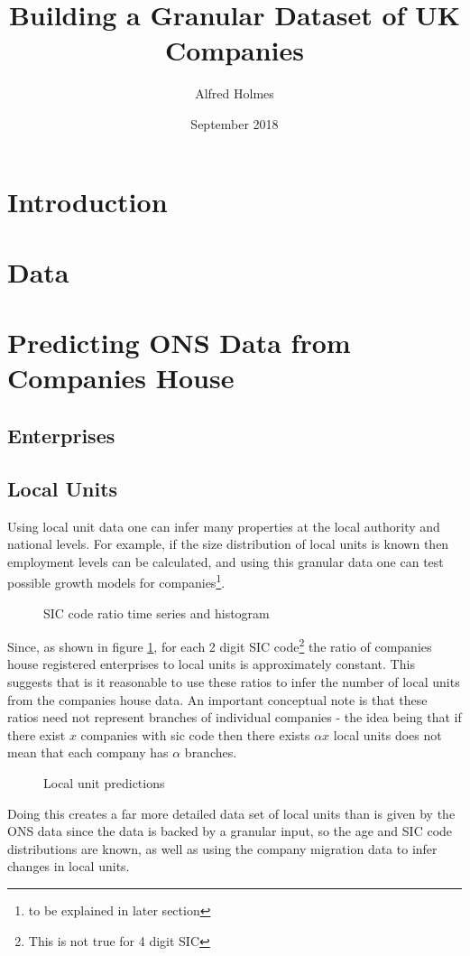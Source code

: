 \documentclass[a4paper,10pt]{article}
\title{Building a Granular Dataset of UK Companies}
\author{Alfred Holmes}
\date{September 2018}
\begin{document}
\maketitle
\section{Introduction}
\section{Data}
\section{Predicting ONS Data from Companies House}
\subsection{Enterprises}
\subsection{Local Units}
Using local unit data one can infer many properties at the local authority and national levels. For example, if the size distribution of local units is known then employment levels can be calculated, and using this granular data one can test possible growth models for companies\footnote{to be explained in later section}.
\begin{figure}[!ht]
 \caption{SIC code ratio time series and histogram}
 \label{sic_ratio}
\end{figure}

Since, as shown in figure \ref{sic_ratio}, for each 2 digit SIC code\footnote{This is not true for 4 digit SIC} the ratio of companies house registered enterprises to local units is approximately constant. This suggests that is it reasonable to use these ratios to infer the number of local units from the companies house data. An important conceptual note is that these ratios need not represent branches of individual companies - the idea being that if there exist $x$ companies with sic code then there exists $\alpha x$ local units does not mean that each company has $\alpha$ branches.

\begin{figure}[!ht]
 \caption{Local unit predictions}
 \label{local_unit_predictions}
\end{figure}

Doing this creates a far more detailed data set of local units than is given by the ONS data since the data is backed by a granular input, so the age and SIC code distributions are known, as well as using the company migration data to infer changes in local units.
\end{document}
